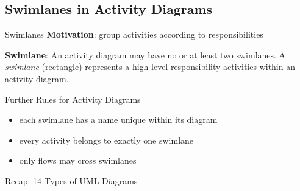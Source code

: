 \subsection{Swimlanes in Activity Diagrams}
\begin{frame}{\insertsubsection}
	\begin{fancycolumns}[animation=none]
		\nextcolumn
		\begin{definition}{{Swimlanes \mysource{\umluserguide}}}
			\textbf{Motivation}: group activities according to responsibilities
			
			\textbf{Swimlane}: An activity diagram may have no or at least two swimlanes. A \emph{swimlane} (rectangle) represents a high-level responsibility activities within an activity diagram. 
		\end{definition}
		\pause
		\begin{note}{Further Rules for Activity Diagrams}
			\begin{itemize}
				\item each swimlane has a name unique within its diagram
				\item every activity belongs to exactly one swimlane
				\item only flows may cross swimlanes
			\end{itemize}
		\end{note}
	\end{fancycolumns}
\end{frame}

\begin{frame}{Recap: 14 Types of UML Diagrams\ \mytitlesource{\umlspec}}
\end{frame}

